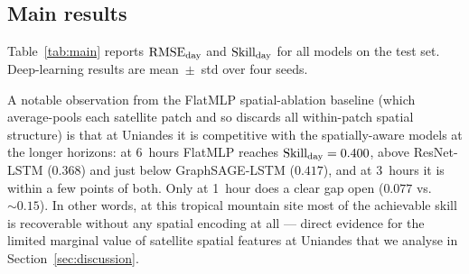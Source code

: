 \FloatBarrier
\subsection{Main results}

Table~\ref{tab:main} reports $\text{RMSE}_\text{day}$ and $\text{Skill}_\text{day}$ for all models on the
test set. Deep-learning results are mean~$\pm$~std over four seeds.

A notable observation from the FlatMLP spatial-ablation baseline (which
average-pools each satellite patch and so discards all within-patch spatial
structure) is that at Uniandes it is competitive with the spatially-aware
models at the longer horizons: at 6~hours FlatMLP reaches
$\text{Skill}_\text{day} = 0.400$, above ResNet-LSTM ($0.368$) and just below
GraphSAGE-LSTM ($0.417$), and at 3~hours it is within a few points of both.
Only at 1~hour does a clear gap open ($0.077$ vs.\ ${\sim}0.15$). In other
words, at this tropical mountain site most of the achievable skill is
recoverable without any spatial encoding at all --- direct evidence for the
limited marginal value of satellite spatial features at Uniandes that we
analyse in Section~\ref{sec:discussion}.

